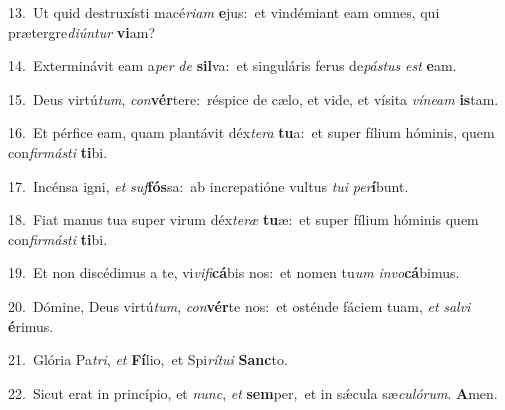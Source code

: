 {\numbfont\textcolor{\numbcolor}{13.}}~Ut quid destruxísti macé\-\textit{ri}\-\textit{am} \textbf{e}\-jus:~\star et vindémiant eam omnes, qui prætergre\-\textit{di}\-\textit{ún}\textit{tur} \textbf{vi}\-am?\par
{\numbfont\textcolor{\numbcolor}{14.}}~Exterminávit eam a\textit{per} \textit{de} \textbf{sil}\-va:~\star et singuláris ferus de\-\textit{pás}\-\textit{tus} \textit{est} \textbf{e}\-am.\par
{\numbfont\textcolor{\numbcolor}{15.}}~Deus virtú\-\textit{tum}\-, \textit{con}\-\textbf{vér}tere:~\star réspice de cælo, et vide, et vísita \textit{ví}\-\textit{ne}\textit{am} \textbf{is}\-tam.\par
{\numbfont\textcolor{\numbcolor}{16.}}~Et pérfice eam, quam plantávit déx\-\textit{te}\-\textit{ra} \textbf{tu}\-a:~\star et super fílium hóminis, quem con\-\textit{fir}\-\textit{más}\textit{ti} \textbf{ti}\-bi.\par
{\numbfont\textcolor{\numbcolor}{17.}}~Incénsa igni, \textit{et} \textit{suf}\-\textbf{fós}sa:~\star ab increpatióne vultus \textit{tu}\-\textit{i} \textit{per}\-\textbf{í}bunt.\par
{\numbfont\textcolor{\numbcolor}{18.}}~Fiat manus tua super virum déx\-\textit{te}\-\textit{ræ} \textbf{tu}\-æ:~\star et super fílium hóminis quem con\-\textit{fir}\-\textit{más}\textit{ti} \textbf{ti}\-bi.\par
{\numbfont\textcolor{\numbcolor}{19.}}~Et non discédimus a te, vi\-\textit{vi}\-\textit{fi}\textbf{cá}bis nos:~\star et nomen tu\textit{um} \textit{in}\-\textit{vo}\textbf{cá}bimus.\par
{\numbfont\textcolor{\numbcolor}{20.}}~Dómine, Deus virtú\-\textit{tum}\-, \textit{con}\-\textbf{vér}te nos:~\star et osténde fáciem tuam, \textit{et} \textit{sal}\-\textit{vi} \textbf{é}\-rimus.\par
{\numbfont\textcolor{\numbcolor}{21.}}~Glória Pa\-\textit{tri}\-, \textit{et} \textbf{Fí}\-lio,~\star et Spi\-\textit{rí}\-\textit{tu}\textit{i} \textbf{Sanc}\-to.\par
{\numbfont\textcolor{\numbcolor}{22.}}~Sicut erat in princípio, et \textit{nunc}\-, \textit{et} \textbf{sem}\-per,~\star et in sǽcula sæ\-\textit{cu}\-\textit{ló}\textit{rum}. \textbf{A}\-men.\par
